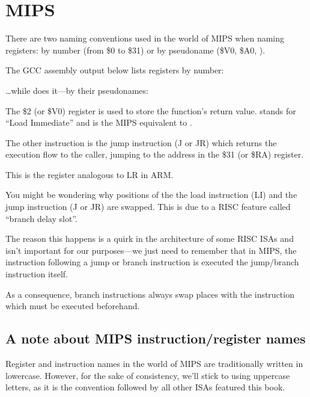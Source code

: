 \section{MIPS}

\label{MIPS_leaf_function_ex1}
There are two naming conventions used in the world of MIPS when naming registers: by number (from \$0 to \$31) or by pseudoname (\$V0, \$A0, \etc{}).

The GCC assembly output below lists registers by number:



\dots while \IDA does it---by their pseudonames:



The \$2 (or \$V0) register is used to store the function's return value.
 stands for ``Load Immediate'' and is the MIPS equivalent to \MOV.

The other instruction is the jump instruction (J or JR) which returns the execution flow to the \gls{caller}, jumping to the address in the \$31 (or \$RA) register.

This is the register analogous to \ac{LR} in ARM.

You might be wondering why positions of the the load instruction (LI) and the jump instruction (J or JR) are swapped. This is due to a \ac{RISC} feature called ``branch delay slot''.

The reason this happens is a quirk in the architecture of some RISC \ac{ISA}s and isn't important for our purposes---we just need to remember that in MIPS, the instruction following a jump or branch instruction
is executed  the jump/branch instruction itself.

As a consequence, branch instructions always swap places with the instruction which must be executed beforehand.

\subsection{A note about MIPS instruction/register names}

Register and instruction names in the world of MIPS are traditionally written in lowercase.
However, for the sake of consistency, we'll stick to using uppercase letters,
as it is the convention followed by all other \ac{ISA}s featured this book.

